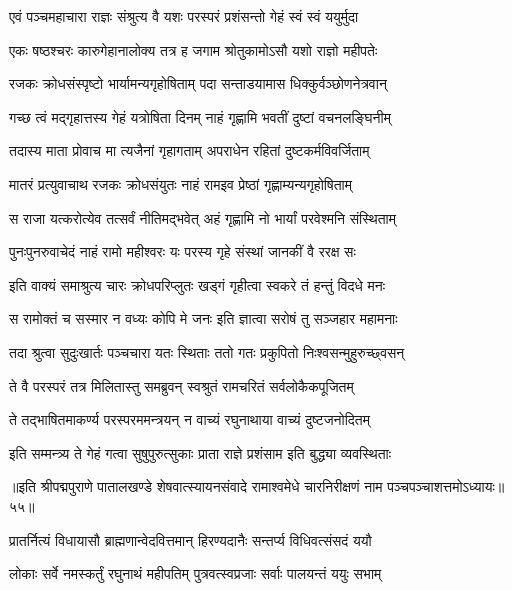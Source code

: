 \twolineshloka
{एवं पञ्चमहाचारा राज्ञः संश्रुत्य वै यशः}
{परस्परं प्रशंसन्तो गेहं स्वं स्वं ययुर्मुदा}%

\twolineshloka
{एकः षष्ठश्चरः कारुगेहानालोक्य तत्र ह}
{जगाम श्रोतुकामोऽसौ यशो राज्ञो महीपतेः}%

\twolineshloka
{रजकः क्रोधसंस्पृष्टो भार्यामन्यगृहोषिताम्}
{पदा सन्ताडयामास धिक्कुर्वञ्छोणनेत्रवान्}%

\twolineshloka
{गच्छ त्वं मद्गृहात्तस्य गेहं यत्रोषिता दिनम्}
{नाहं गृह्णामि भवतीं दुष्टां वचनलङ्घिनीम्}%

\twolineshloka
{तदास्य माता प्रोवाच मा त्यजैनां गृहागताम्}
{अपराधेन रहितां दुष्टकर्मविवर्जिताम्}%

\twolineshloka
{मातरं प्रत्युवाचाथ रजकः क्रोधसंयुतः}
{नाहं रामइव प्रेष्ठां गृह्णाम्यन्यगृहोषिताम्}%

\twolineshloka
{स राजा यत्करोत्येव तत्सर्वं नीतिमद्भवेत्}
{अहं गृह्णामि नो भार्यां परवेश्मनि संस्थिताम्}%

\twolineshloka
{पुनःपुनरुवाचेदं नाहं रामो महीश्वरः}
{यः परस्य गृहे संस्थां जानकीं वै ररक्ष सः}%

\twolineshloka
{इति वाक्यं समाश्रुत्य चारः क्रोधपरिप्लुतः}
{खड्गं गृहीत्वा स्वकरे तं हन्तुं विदधे मनः}%

\twolineshloka
{स रामोक्तं च सस्मार न वध्यः कोपि मे जनः}
{इति ज्ञात्वा सरोषं तु सञ्जहार महामनाः}%

\twolineshloka
{तदा श्रुत्वा सुदुःखार्तः पञ्चचारा यतः स्थिताः}
{ततो गतः प्रकुपितो निःश्वसन्मुहुरुच्छ्वसन्}%

\twolineshloka
{ते वै परस्परं तत्र मिलितास्तु समब्रुवन्}
{स्वश्रुतं रामचरितं सर्वलोकैकपूजितम्}%

\twolineshloka
{ते तद्भाषितमाकर्ण्य परस्परममन्त्रयन्}
{न वाच्यं रघुनाथाया वाच्यं दुष्टजनोदितम्}%

\twolineshloka
{इति सम्मन्त्र्य ते गेहं गत्वा सुषुपुरुत्सुकाः}
{प्राता राज्ञे प्रशंसाम इति बुद्ध्या व्यवस्थिताः}%

॥इति श्रीपद्मपुराणे पातालखण्डे शेषवात्स्यायनसंवादे रामाश्वमेधे चारनिरीक्षणं नाम पञ्चपञ्चाशत्तमोऽध्यायः॥५५॥



\twolineshloka
{प्रातर्नित्यं विधायासौ ब्राह्मणान्वेदवित्तमान्}
{हिरण्यदानैः सन्तर्प्य विधिवत्संसदं ययौ}%

\twolineshloka
{लोकाः सर्वे नमस्कर्तुं रघुनाथं महीपतिम्}
{पुत्रवत्स्वप्रजाः सर्वाः पालयन्तं ययुः सभाम्}%


